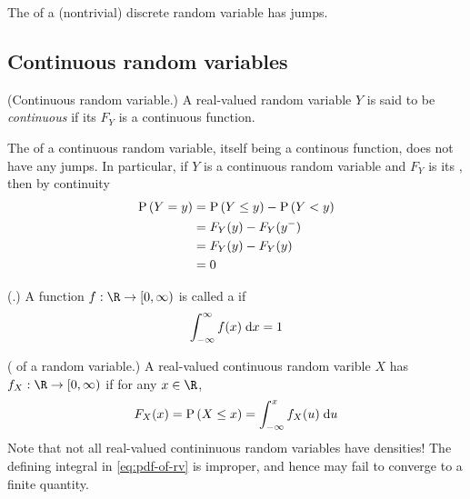 \documentclass[11pt]{article}
\begin{document}
\begin{rem}
    The \cdf{} of a (nontrivial) discrete random variable has jumps.
\end{rem}

\subsection{Continuous random variables}

\begin{defn}{(Continuous random variable.)}
    A real-valued random variable $Y$ is said to be \emph{continuous} if its
    \cdf{} $F_Y$ is a continuous function.
\end{defn}

\begin{rem}
    The \cdf{} of a continuous random variable, itself being a continous
    function, does not have any jumps.
    In particular, if $Y$ is a continuous random variable and $F_Y$ is its
    \cdf, then by continuity
    \begin{align}
        \operatorname{P}{\left(Y = y\right)}
        &= \operatorname{P}{\left(Y \leq y\right)} - \operatorname{P}{\left(Y < y\right)} \notag \\
        &= F_Y(y) - F_Y(y^-) \notag \\
        &= F_Y(y) - F_Y(y) \notag \\
        &= 0
        \label{eq:point-probability-of-cts-rv-is-zero}
    \end{align}
\end{rem}

\begin{defn}{(\Pdf.)}
    \label{def:pdf}
    A function $f : \R \to [0, \infty)$ is called a \emph{\pdf{}} if
    \begin{equation}
        \label{eq:pdf}
        \int_{-\infty}^{\infty}{
            f(x) \;\mathrm{d} x
        }
        = 1
    \end{equation}
\end{defn}

\begin{defn}{(\Pdf{} of a random variable.)}
    \label{def:pdf-of-rv}
    A real-valued continuous random varible $X$ has \pdf{}
    $f_X : \R \to [0, \infty)$
    if for any $x \in \R$,
    \begin{equation}
        \label{eq:pdf-of-rv}
        F_X(x) = \operatorname{P}{\left(X \leq x\right)} = \int_{-\infty}^x {
            f_X(u) \;\mathrm{d} u
        }
    \end{equation}
    Note that not all real-valued contininuous random variables have densities!
    The defining integral in \eqref{eq:pdf-of-rv} is improper, and hence may
    fail to converge to a finite quantity.
\end{defn}
\end{document}
